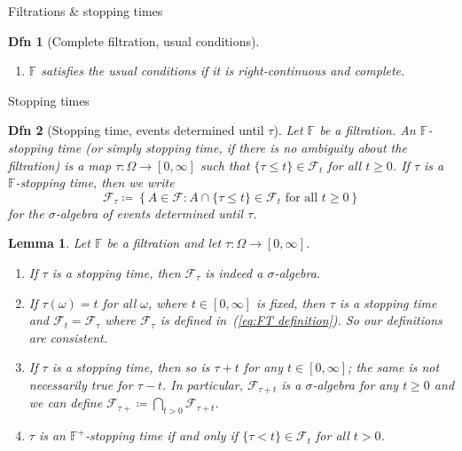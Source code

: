 \documentclass[a4paper]{article}
\theoremstyle{mytheoremstyle}
\newtheorem{definition}{Dfn}
\newtheorem{lemma}{Lemma}
\newcommand{\1}{\mathds{1}}
\begin{document}
\begin{multicols*}{3}
\begin{roundbox}{Filtrations \& stopping times}
\begin{definition}[Complete filtration, usual conditions]
\begin{enumerate}[parsep=0.2pt]
    \item $\mathbb{F}$ satisfies the {\emph{usual conditions}} if it is
    right-continuous and complete.
  \end{enumerate}
\end{definition}
\end{roundbox}

\begin{roundbox}{Stopping times}
\begin{definition}[Stopping time, events determined until $\tau$]
  Let $\mathbb{F}$ be a filtration. An {\emph{$\mathbb{F}$-stopping time}} (or
  simply {\emph{stopping time}}, if there is no ambiguity about the
  filtration) is a map $\tau : \Omega \rightarrow [0, \infty]$ such that
  $\{\tau \leqslant t\} \in \mathcal{F}_t$ for all $t \geqslant 0$. If $\tau$
  is a $\mathbb{F}$-stopping time, then we write
  \begin{equation}
    \label{eq:FT definition} \mathcal{F}_{\tau} \coloneq \left\{ A \in
    \mathcal{F}: A \cap \{\tau \leqslant t\} \in \mathcal{F}_t \text{ for all
    } t \geqslant 0 \right\}
  \end{equation}
  for the $\sigma$-algebra of {\emph{events determined until $\tau$}}.
\end{definition}

\begin{lemma}
  Let $\mathbb{F}$ be a filtration and let $\tau : \Omega \rightarrow [0, \infty]$.
  \begin{enumerate}[parsep=0.2pt]
    \item If $\tau$ is a stopping time, then $\mathcal{F}_{\tau}$ is indeed a
    $\sigma$-algebra.
    
    \item If $\tau (\omega) = t$ for all $\omega$, where $t \in [0, \infty]$
    is fixed, then $\tau$ is a stopping time and $\mathcal{F}_t
    =\mathcal{F}_{\tau}$ where $\mathcal{F}_{\tau}$ is defined
    in~(\ref{eq:FT definition}). So our definitions are consistent.
    
    \item If $\tau$ is a stopping time, then so is $\tau + t$ for any $t \in
    [0, \infty]$; the same is not necessarily true for $\tau - t$. In
    particular, $\mathcal{F}_{\tau + t}$ is a $\sigma$-algebra for any $t
    \geqslant 0$ and we can define $\mathcal{F}_{\tau +} \coloneq \bigcap_{t >
    0} \mathcal{F}_{\tau + t}$.
    
    \item $\tau$ is an $\mathbb{F}^+$-stopping time if and only if $\{\tau <
    t\} \in \mathcal{F}_t$ for all $t > 0$.
    

\end{enumerate}
\end{lemma}
\end{roundbox}
\end{multicols*}
\end{document}

